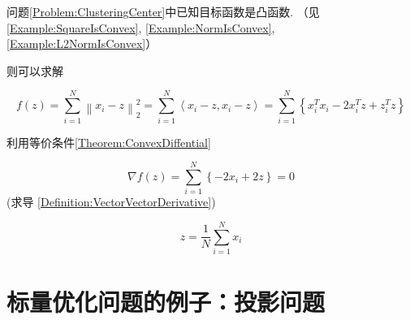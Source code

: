 问题\ref{Problem:ClusteringCenter}中已知目标函数是凸函数. （见\ref{Example:SquareIsConvex}, \ref{Example:NormIsConvex}, \ref{Example:L2NormIsConvex}）

则可以求解

$$ f(z)=\sum_{i=1}^{N}\left\|x_{i}-z\right\|_{2}^{2}=\sum_{i=1}^{N}\left\langle x_{i}-z, x_{i}-z\right\rangle=\sum_{i=1}^{N}\left\{x_{i}^{T} x_{i}-2 x_{i}^{T} z+z_{i}^{T} z\right\} $$

利用等价条件\ref{Theorem:ConvexDiffential}

$$ \nabla f(z)=\sum_{i=1}^{N}\left\{-2 x_{i}+2 z\right\}=0 $$ (求导 \ref{Definition:VectorVectorDerivative})

$$ z=\frac{1}{N} \sum_{i=1}^{N} x_{i} $$

\section{标量优化问题的例子：投影问题}

